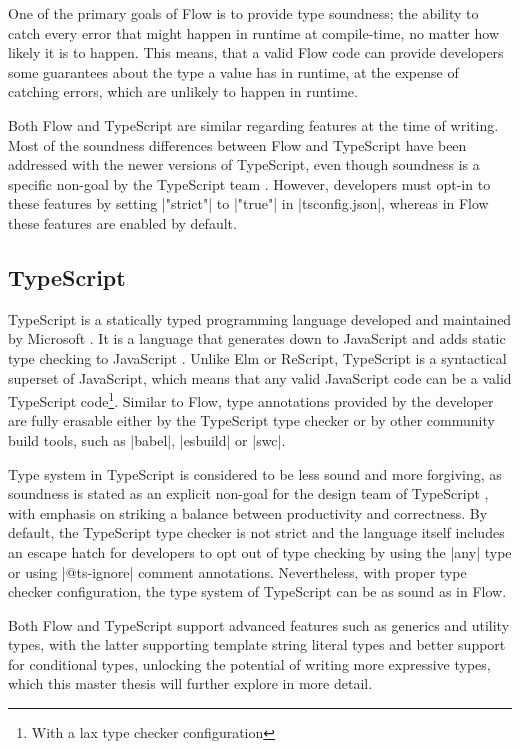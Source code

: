 One of the primary goals of Flow is to provide type soundness; the ability to catch every error that might happen in runtime at compile-time, no matter how likely it is to happen. This means, that a valid Flow code can provide developers some guarantees about the type a value has in runtime, at the expense of catching errors, which are unlikely to happen in runtime.

Both Flow and TypeScript are similar regarding features at the time of writing. Most of the soundness differences between Flow and TypeScript have been addressed with the newer versions of TypeScript, even though soundness is a specific non-goal by the TypeScript team \cite{TypeScriptDesignGoals}. However, developers must opt-in to these features by setting \code|"strict"| to \code|"true"| in \code|tsconfig.json|, whereas in Flow these features are enabled by default.

\subsection{TypeScript}

TypeScript is a statically typed programming language developed and maintained by Microsoft \cite{TypeScriptJavaScriptSyntax}. It is a language that generates down to JavaScript and adds static type checking to JavaScript \cite{DocumentationTypeScriptJavaScript}. Unlike Elm or ReScript, TypeScript is a syntactical superset of JavaScript, which means that any valid JavaScript code can be a valid TypeScript code\footnote{With a lax type checker configuration}. Similar to Flow, type annotations provided by the developer are fully erasable either by the TypeScript  type checker or by other community build tools, such as \code|babel|\cite{BabelCompilerNext}, \code|esbuild|\cite{EsbuildExtremelyFast} or \code|swc|\cite{SWCRustbasedPlatform}.

Type system in TypeScript is considered to be less sound and more forgiving, as soundness is stated as an explicit non-goal for the design team of TypeScript \cite{TypeScriptDesignGoals}, with emphasis on striking a balance between productivity and correctness. By default, the TypeScript type checker is not strict and the language itself includes an escape hatch for developers to opt out of type checking by using the \code|any| type or using \code|@ts-ignore| comment annotations. Nevertheless, with proper type checker configuration, the type system of TypeScript can be as sound as in Flow.

Both Flow and TypeScript support advanced features such as generics and utility types, with the latter supporting template string literal types and better support for conditional types, unlocking the potential of writing more expressive types, which this master thesis will further explore in more detail.

